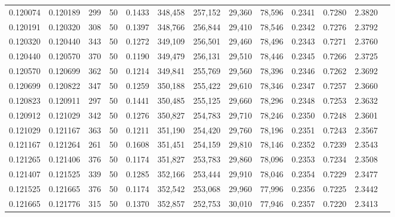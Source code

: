 \begin{tabular}{rrrrrrrrrrrrr}
0.120074 & 0.120189 &   299 &  50 &                                     0.1433 & 348,458 & 257,152 &  29,360 &  78,596 & 0.2341 & 0.7280 & 2.3820 \\
0.120191 & 0.120320 &   308 &  50 &                                     0.1397 & 348,766 & 256,844 &  29,410 &  78,546 & 0.2342 & 0.7276 & 2.3792 \\
0.120320 & 0.120440 &   343 &  50 &                                     0.1272 & 349,109 & 256,501 &  29,460 &  78,496 & 0.2343 & 0.7271 & 2.3760 \\
0.120440 & 0.120570 &   370 &  50 &                                     0.1190 & 349,479 & 256,131 &  29,510 &  78,446 & 0.2345 & 0.7266 & 2.3725 \\
0.120570 & 0.120699 &   362 &  50 &                                     0.1214 & 349,841 & 255,769 &  29,560 &  78,396 & 0.2346 & 0.7262 & 2.3692 \\
0.120699 & 0.120822 &   347 &  50 &                                     0.1259 & 350,188 & 255,422 &  29,610 &  78,346 & 0.2347 & 0.7257 & 2.3660 \\
0.120823 & 0.120911 &   297 &  50 &                                     0.1441 & 350,485 & 255,125 &  29,660 &  78,296 & 0.2348 & 0.7253 & 2.3632 \\
0.120912 & 0.121029 &   342 &  50 &                                     0.1276 & 350,827 & 254,783 &  29,710 &  78,246 & 0.2350 & 0.7248 & 2.3601 \\
0.121029 & 0.121167 &   363 &  50 &                                     0.1211 & 351,190 & 254,420 &  29,760 &  78,196 & 0.2351 & 0.7243 & 2.3567 \\
0.121167 & 0.121264 &   261 &  50 &                                     0.1608 & 351,451 & 254,159 &  29,810 &  78,146 & 0.2352 & 0.7239 & 2.3543 \\
0.121265 & 0.121406 &   376 &  50 &                                     0.1174 & 351,827 & 253,783 &  29,860 &  78,096 & 0.2353 & 0.7234 & 2.3508 \\
0.121407 & 0.121525 &   339 &  50 &                                     0.1285 & 352,166 & 253,444 &  29,910 &  78,046 & 0.2354 & 0.7229 & 2.3477 \\
0.121525 & 0.121665 &   376 &  50 &                                     0.1174 & 352,542 & 253,068 &  29,960 &  77,996 & 0.2356 & 0.7225 & 2.3442 \\
0.121665 & 0.121776 &   315 &  50 &                                     0.1370 & 352,857 & 252,753 &  30,010 &  77,946 & 0.2357 & 0.7220 & 2.3413 \\

\end{tabular}
